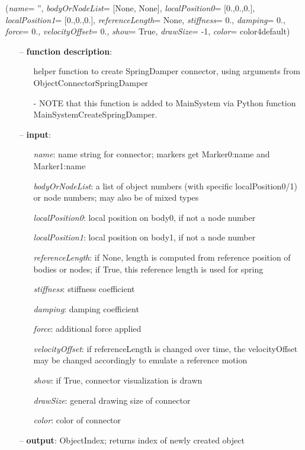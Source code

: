 %
\begin{flushleft}
\label{sec:mainsystemextensions:CreateSpringDamper}
({\it name}= '', {\it bodyOrNodeList}= [None, None], {\it localPosition0}= [0.,0.,0.], {\it localPosition1}= [0.,0.,0.], {\it referenceLength}= None, {\it stiffness}= 0., {\it damping}= 0., {\it force}= 0., {\it velocityOffset}= 0., {\it show}= True, {\it drawSize}= -1, {\it color}= color4default)
\end{flushleft}
\setlength{\itemindent}{0.7cm}
\begin{itemize}[leftmargin=0.7cm]
\item[--]
{\bf function description}: \vspace{-6pt}
\begin{itemize}[leftmargin=1.2cm]
\setlength{\itemindent}{-0.7cm}
\item[]helper function to create SpringDamper connector, using arguments from ObjectConnectorSpringDamper
\item[]- NOTE that this function is added to MainSystem via Python function MainSystemCreateSpringDamper.
\end{itemize}
\item[--]
{\bf input}: \vspace{-6pt}
\begin{itemize}[leftmargin=1.2cm]
\setlength{\itemindent}{-0.7cm}
\item[]{\it name}: name string for connector; markers get Marker0:name and Marker1:name
\item[]{\it bodyOrNodeList}: a list of object numbers (with specific localPosition0/1) or node numbers; may also be of mixed types
\item[]{\it localPosition0}: local position on body0, if not a node number
\item[]{\it localPosition1}: local position on body1, if not a node number
\item[]{\it referenceLength}: if None, length is computed from reference position of bodies or nodes; if True, this reference length is used for spring
\item[]{\it stiffness}: stiffness coefficient
\item[]{\it damping}: damping coefficient
\item[]{\it force}: additional force applied
\item[]{\it velocityOffset}: if referenceLength is changed over time, the velocityOffset may be changed accordingly to emulate a reference motion
\item[]{\it show}: if True, connector visualization is drawn
\item[]{\it drawSize}: general drawing size of connector
\item[]{\it color}: color of connector
\end{itemize}
\item[--]
{\bf output}: ObjectIndex; returns index of newly created object
\vspace{12pt}\end{itemize}
%

